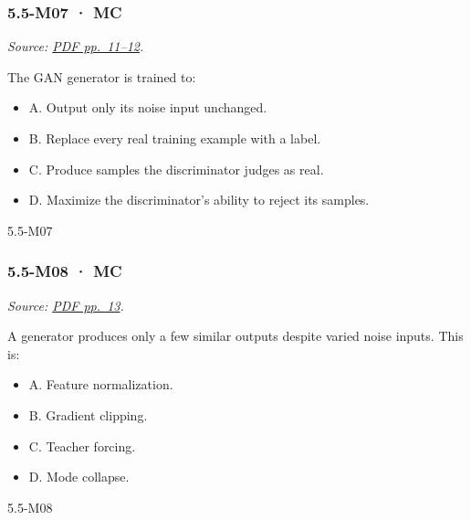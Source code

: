 \noindent\begin{minipage}{\linewidth}

\subsubsection{5.5-M07 · MC}\label{m07-mc-16}

\emph{Source:
\href{../Lecture\%20Slides/5.5.\%20Generative\%20Models.pdf\#page=11}{PDF
pp.~11--12}.}

The GAN generator is trained to:

\begin{itemize}
\tightlist
\item
  A. Output only its noise input unchanged.
\item
  B. Replace every real training example with a label.
\item
  C. Produce samples the discriminator judges as real.
\item
  D. Maximize the discriminator's ability to reject its samples.
\end{itemize}

\begin{solution}[8mm]{5.5-M07}

\end{solution}
\end{minipage}\par\medskip

\noindent\begin{minipage}{\linewidth}

\subsubsection{5.5-M08 · MC}\label{m08-mc-16}

\emph{Source:
\href{../Lecture\%20Slides/5.5.\%20Generative\%20Models.pdf\#page=13}{PDF
pp.~13}.}

A generator produces only a few similar outputs despite varied noise
inputs. This is:

\begin{itemize}
\tightlist
\item
  A. Feature normalization.
\item
  B. Gradient clipping.
\item
  C. Teacher forcing.
\item
  D. Mode collapse.
\end{itemize}

\begin{solution}[8mm]{5.5-M08}

\end{solution}
\end{minipage}\par\medskip

